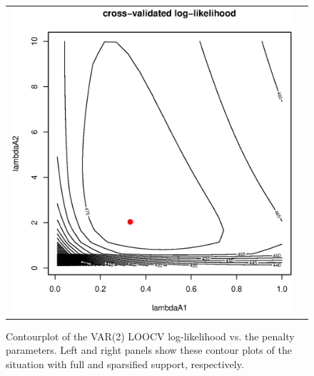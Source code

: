 \begin{figure}[h!]
\begin{tabular}{cc}
\includegraphics[scale=0.35]{Figure_5b.eps}
\end{tabular}
\caption{Contourplot of the VAR(2) LOOCV log-likelihood vs. the penalty parameters. Left and right panels show these contour plots of the situation with full and sparsified support, respectively.}
\label{fig:contourVAR2}
\end{figure}

